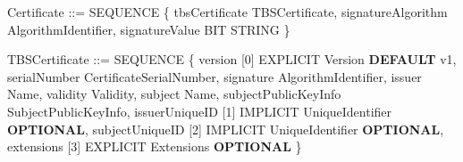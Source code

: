 \documentclass[
]{article}
\newenvironment{Shaded}{}{}
\newcommand{\DataTypeTok}[1]{\textcolor[rgb]{0.56,0.13,0.00}{#1}}
\newcommand{\DecValTok}[1]{\textcolor[rgb]{0.25,0.63,0.44}{#1}}
\newcommand{\KeywordTok}[1]{\textcolor[rgb]{0.00,0.44,0.13}{\textbf{#1}}}
\newcommand{\NormalTok}[1]{#1}
\begin{document}
\begin{Shaded}
\begin{Highlighting}[]
\NormalTok{Certificate ::= }\DataTypeTok{SEQUENCE}\NormalTok{ \{}
\NormalTok{    tbsCertificate          TBSCertificate,}
\NormalTok{    signatureAlgorithm      AlgorithmIdentifier,}
\NormalTok{    signatureValue          BIT }\DataTypeTok{STRING}
\NormalTok{\}}

\NormalTok{TBSCertificate ::= }\DataTypeTok{SEQUENCE}\NormalTok{ \{}
\NormalTok{    version             [}\DecValTok{0}\NormalTok{] EXPLICIT Version }\KeywordTok{DEFAULT}\NormalTok{ v1,}
\NormalTok{    serialNumber            CertificateSerialNumber,}
\NormalTok{    signature               AlgorithmIdentifier,}
\NormalTok{    issuer                  Name,}
\NormalTok{    validity                Validity,}
\NormalTok{    subject                 Name,}
\NormalTok{    subjectPublicKeyInfo    SubjectPublicKeyInfo,}
\NormalTok{    issuerUniqueID      [}\DecValTok{1}\NormalTok{] IMPLICIT UniqueIdentifier }\KeywordTok{OPTIONAL}\NormalTok{,}
\NormalTok{    subjectUniqueID     [}\DecValTok{2}\NormalTok{] IMPLICIT UniqueIdentifier }\KeywordTok{OPTIONAL}\NormalTok{,}
\NormalTok{    extensions          [}\DecValTok{3}\NormalTok{] EXPLICIT Extensions }\KeywordTok{OPTIONAL}
\NormalTok{\}}
\end{Highlighting}
\end{Shaded}
\end{document}
